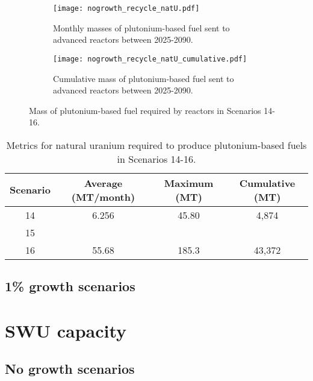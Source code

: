 \begin{figure}[h!]
    \centering
    \begin{subfigure}[b]{0.45\textwidth}
        \centering
        \texttt{[image: nogrowth\_recycle\_natU.pdf]}
        \caption{Monthly masses of plutonium-based fuel sent to 
        advanced reactors between 2025-2090.}
        \label{fig:nogrowth_recycle_AR_natu}
    \end{subfigure}
    \hfill
    \begin{subfigure}[b]{0.45\textwidth}
        \centering
        \texttt{[image: nogrowth\_recycle\_natU\_cumulative.pdf]}
        \caption{Cumulative mass of plutonium-based fuel
        sent to advanced reactors between 2025-2090.}
        \label{fig:nogrowth_recycle_natu_cumulative}
    \end{subfigure}
       \caption{Mass of plutonium-based fuel required by reactors
        in Scenarios 14-16.}
       \label{fig:nogrowth_recycle_natu}
\end{figure}

\begin{table}[h!]
    \centering 
    \caption{Metrics for natural uranium required to produce 
    plutonium-based fuels in Scenarios 14-16.}
    \label{tab:s14-16_natU}
    \begin{tabular}{c c c c}
        \hline 
        Scenario & Average (MT/month) & Maximum (MT) & Cumulative (MT) \\
        \hline 
        14 & 6.256 & 45.80 & 4,874 \\
        15 & & &  \\
        16 & 55.68 & 185.3 & 43,372 \\
        \hline
        
    \end{tabular}
\end{table}



\subsection{1\% growth scenarios}

\section{SWU capacity}
\subsection{No growth scenarios}

